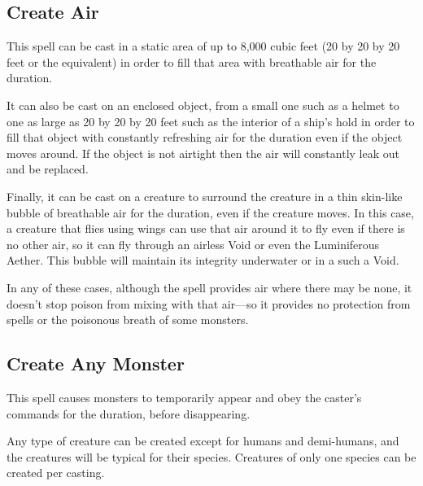 \begin{multicols*}{2}
\subsection{Create Air}\label{spell:Create Air}

This spell can be cast in a static area of up to 8,000 cubic feet (20 by 20 by 20 feet or the equivalent) in order to fill that area with breathable air for the duration.

It can also be cast on an enclosed object, from a small one such as a helmet to one as large as 20 by 20 by 20 feet such as the interior of a ship’s hold in order to fill that object with constantly refreshing air for the duration even if the object moves around. If the object is not airtight then the air will constantly leak out and be replaced.

Finally, it can be cast on a creature to surround the creature in a thin skin-like bubble of breathable air for the duration, even if the creature moves. In this case, a creature that flies using wings can use that air around it to fly even if there is no other air, so it can fly through an airless Void or even the Luminiferous Aether. This bubble will maintain its integrity underwater or in a such a Void.

In any of these cases, although the spell provides air where there may be none, it doesn’t stop poison from mixing with that air—so it provides no protection from  spells or the poisonous breath of some monsters.

\subsection{Create Any Monster}\label{spell:Create Any Monster}

This spell causes monsters to temporarily appear and obey the caster’s commands for the duration, before disappearing.

Any type of creature can be created except for humans and demi-humans, and the creatures will be typical for their species. Creatures of only one species can be created per casting.


\end{multicols*}
